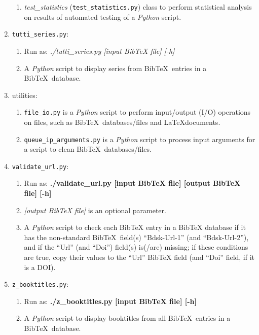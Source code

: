 \begin{enumerate}
\begin{enumerate}
	\item {\it test\_statistics} ({\tt test\_statistics.py}) class to perform statistical analysis on results of automated testing of a {\it Python} script.
	\end{enumerate}
\item {\tt tutti\_series.py}: \vspace{-0.3cm}
	\begin{enumerate} \itemsep -2pt
	\item Run as: {\it ./tutti\_series.py [input BibTeX file] [-h]}
	\item A {\it Python} script to display series from {\sc Bib}\TeX\ entries in a {\sc Bib}\TeX\ database.
	\end{enumerate}
\item utilities: \vspace{-0.3cm}
	\begin{enumerate} \itemsep -2pt
	\item {\tt file\_io.py} is a {\it Python} script to perform input/output (I/O) operations on files, such as {\sc Bib}\TeX\ databases/files and \LaTeX documents.
	\item {\tt queue\_ip\_arguments.py} is a {\it Python} script to process input arguments for a script to clean {\sc Bib}\TeX\ databases/files.
	\end{enumerate}
\item {\tt validate\_url.py}: \vspace{-0.3cm}
	\begin{enumerate} \itemsep -2pt
	\item Run as: {\bf ./validate\_url.py [input BibTeX file] [output BibTeX file] [-h]}
	\item {\it [output BibTeX file]} is an optional parameter.
	\item A {\it Python} script to check each BibTeX entry in a BibTeX database if it has the non-standard {\sc Bib}\TeX\ field(s) ``Bdsk-Url-1'' (and ``Bdsk-Url-2''), and if the ``Url'' (and ``Doi'') field(s) is(/are) missing; if these conditions are true, copy their values to the ``Url'' BibTeX field (and ``Doi'' field, if it is a DOI).
	\end{enumerate}
\item {\tt z\_booktitles.py}: \vspace{-0.3cm}
	\begin{enumerate} \itemsep -2pt
	\item Run as: {\bf ./z\_booktitles.py [input BibTeX file] [-h]}
	\item A {\it Python} script to display booktitles from all {\sc Bib}\TeX\ entries in a {\sc Bib}\TeX\ database.
	\end{enumerate}
\end{enumerate}

























